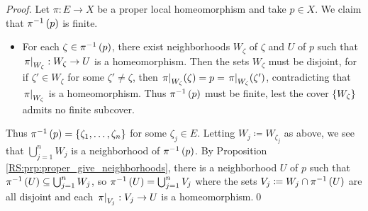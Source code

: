 \documentclass[../Moduli_Spaces_of_Riemann_Surfaces.tex]{subfiles}
\begin{document}
    \begin{proof}
        Let $\pi:E\to X$ be a proper local homeomorphism and take $p\in X$. We claim that $\pi^{-1}\left(p\right)$ is finite.
        \begin{itemize}
            \item For each $\zeta\in\pi^{-1}\left(p\right)$, there exist neighborhoods $W_\zeta$ of $\zeta$ and $U$ of $p$ such that $\left.\pi\right|_{W_\zeta}:W_\zeta\to U$ is a homeomorphism. Then the sets $W_\zeta$ must be disjoint, for if $\zeta'\in W_\zeta$ for some $\zeta'\neq\zeta$, then $\left.\pi\right|_{W_\zeta}\!\left(\zeta\right)=p=\left.\pi\right|_{W_\zeta}\!\left(\zeta'\right)$, contradicting that $\left.\pi\right|_{W_\zeta}$ is a homeomorphism. Thus $\pi^{-1}\left(p\right)$ must be finite, lest the cover $\left\{W_\zeta\right\}$ admits no finite subcover.
        \end{itemize}
        Thus $\pi^{-1}\left(p\right)=\left\{\zeta_1,\dots,\zeta_n\right\}$ for some $\zeta_j\in E$. Letting $W_j\coloneqq W_{\zeta_j}$ as above, we see that $\bigcup_{j=1}^{n}W_j$ is a neighborhood of $\pi^{-1}\left(p\right)$. By Proposition \ref{RS:prp:proper_give_neighborhoods}, there is a neighborhood $U$ of $p$ such that $\pi^{-1}\left(U\right)\subseteq\bigcup_{j=1}^{n}W_j$, so $\pi^{-1}\left(U\right)=\bigcup_{j=1}^{n}V_j$ where the sets $V_j\coloneqq W_j\cap\pi^{-1}\left(U\right)$ are all disjoint and each $\left.\pi\right|_{V_j}:V_j\to U$ is a homeomorphism.\qed
    \end{proof}
\end{document}
